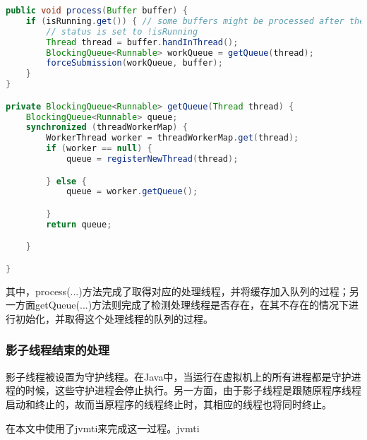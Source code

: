 \begin{lstlisting}[language=Java]
public void process(Buffer buffer) {
	if (isRunning.get()) { // some buffers might be processed after the
		// status is set to !isRunning
		Thread thread = buffer.handInThread();
		BlockingQueue<Runnable> workQueue = getQueue(thread);
		forceSubmission(workQueue, buffer);
	}
}

private BlockingQueue<Runnable> getQueue(Thread thread) {
	BlockingQueue<Runnable> queue;
	synchronized (threadWorkerMap) {
		WorkerThread worker = threadWorkerMap.get(thread);
		if (worker == null) {
			queue = registerNewThread(thread);

		} else {
			queue = worker.getQueue();

		}
		return queue;

	}

}
\end{lstlisting}

其中，process(...)方法完成了取得对应的处理线程，并将缓存加入队列的过程；另一方面getQueue(...)方法则完成了检测处理线程是否存在，在其不存在的情况下进行初始化，并取得这个处理线程的队列的过程。

\subsubsection{影子线程结束的处理}

影子线程被设置为守护线程。在Java中，当运行在虚拟机上的所有进程都是守护进程的时候，这些守护进程会停止执行。另一方面，由于影子线程是跟随原程序线程启动和终止的，故而当原程序的线程终止时，其相应的线程也将同时终止。

在本文中使用了jvmti来完成这一过程。jvmti
